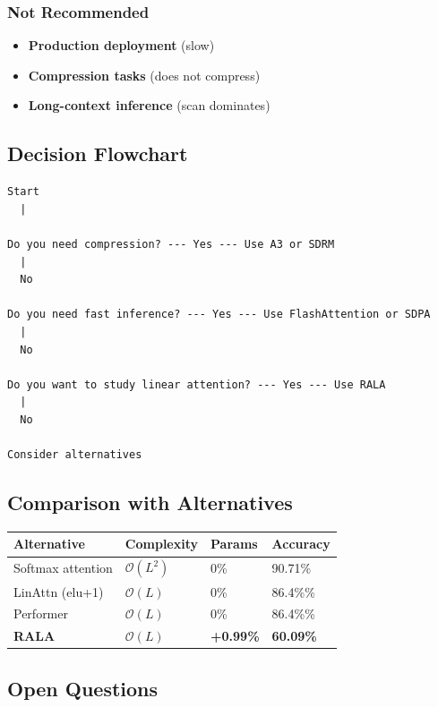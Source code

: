 \subsubsection{Not Recommended}

\begin{itemize}
\item \textbf{Production deployment} (slow)
\item \textbf{Compression tasks} (does not compress)
\item \textbf{Long-context inference} (scan dominates)

\end{itemize}
\subsection{Decision Flowchart}

\begin{lstlisting}
Start
  |
   
Do you need compression? --- Yes --- Use A3 or SDRM
  |
  No
   
Do you need fast inference? --- Yes --- Use FlashAttention or SDPA
  |
  No
   
Do you want to study linear attention? --- Yes --- Use RALA
  |
  No
   
Consider alternatives
\end{lstlisting}

\subsection{Comparison with Alternatives}

\begin{table}[H]
\centering
\small
\begin{tabular}{llll}
\toprule
\textbf{Alternative} & \textbf{Complexity} & \textbf{Params} & \textbf{Accuracy} \\
\midrule
Softmax attention & $\mathcal{O}(L^2)$ & 0\% & 90.71\% \\
LinAttn (elu+1) & $\mathcal{O}(L)$ & 0\% & 86.4\%\% \\
Performer & $\mathcal{O}(L)$ & 0\% & 86.4\%\% \\
\textbf{RALA} & \textbf{$\mathcal{O}(L)$} & \textbf{+0.99\%} & \textbf{60.09\%} \\
\bottomrule
\end{tabular}
\end{table}

\subsection{Open Questions}

